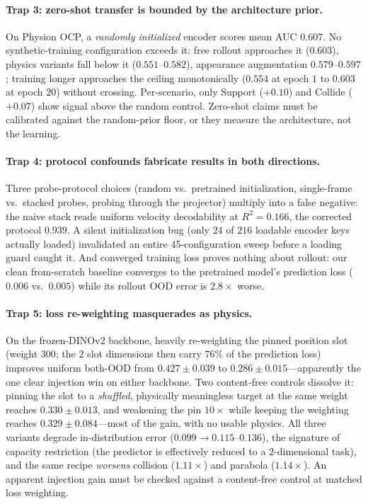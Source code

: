 \paragraph{Trap 3: zero-shot transfer is bounded by the architecture prior.}
On Physion OCP, a \emph{randomly initialized} encoder scores mean AUC $0.607$. No synthetic-training configuration exceeds it: free rollout approaches it ($0.603$), physics variants fall below it ($0.551$--$0.582$), appearance augmentation $0.579$--$0.597$; training longer approaches the ceiling monotonically ($0.554$ at epoch $1$ to $0.603$ at epoch $20$) without crossing. Per-scenario, only Support ($+0.10$) and Collide ($+0.07$) show signal above the random control. Zero-shot claims must be calibrated against the random-prior floor, or they measure the architecture, not the learning.

\paragraph{Trap 4: protocol confounds fabricate results in both directions.}
Three probe-protocol choices (random vs.\ pretrained initialization, single-frame vs.\ stacked probes, probing through the projector) multiply into a false negative: the naive stack reads uniform velocity decodability at $R^{2}{=}0.166$, the corrected protocol $0.939$. A silent initialization bug (only $24$ of $216$ loadable encoder keys actually loaded) invalidated an entire 45-configuration sweep before a loading guard caught it. And converged training loss proves nothing about rollout: our clean from-scratch baseline converges to the pretrained model's prediction loss ($0.006$ vs.\ $0.005$) while its rollout OOD error is $2.8\times$ worse.

\paragraph{Trap 5: loss re-weighting masquerades as physics.}
On the frozen-DINOv2 backbone, heavily re-weighting the pinned position slot (weight $300$; the $2$ slot dimensions then carry $76\%$ of the prediction loss) improves uniform both-OOD from $0.427{\pm}0.039$ to $0.286{\pm}0.015$---apparently the one clear injection win on either backbone. Two content-free controls dissolve it: pinning the slot to a \emph{shuffled}, physically meaningless target at the same weight reaches $0.330{\pm}0.013$, and weakening the pin $10\times$ while keeping the weighting reaches $0.329{\pm}0.084$---most of the gain, with no usable physics. All three variants degrade in-distribution error ($0.099\!\to\!0.115$--$0.136$), the signature of capacity restriction (the predictor is effectively reduced to a $2$-dimensional task), and the same recipe \emph{worsens} collision ($1.11\times$) and parabola ($1.14\times$). An apparent injection gain must be checked against a content-free control at matched loss weighting.

